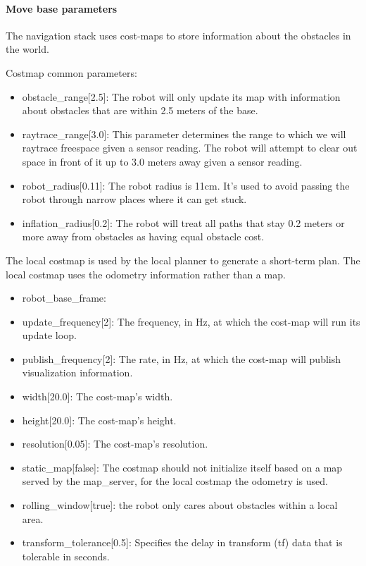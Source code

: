 \documentclass[10pt,journal,compsoc]{IEEEtran}
\begin{document}
\paragraph{Move base parameters}

The navigation stack uses cost-maps to store information about the obstacles in the world.


Costmap common parameters:

\begin{itemize}
\item obstacle\_range[2.5]: The robot will only update its map with information about obstacles that are within 2.5 meters of the base.
\item raytrace\_range[3.0]: This parameter determines the range to which we will raytrace freespace given a sensor reading. The robot will attempt to clear out space in front of it up to 3.0 meters away given a sensor reading.
\item robot\_radius[0.11]: The robot radius is 11cm. It's used to avoid passing the robot through narrow places where it can get stuck.
\item inflation\_radius[0.2]: The robot will treat all paths that stay 0.2 meters or more away from obstacles as having equal obstacle cost.
\end{itemize}

The local costmap is used by the local planner to generate a short-term plan. The local costmap uses the odometry information rather than a map.

\begin{itemize}
\item robot\_base\_frame: 
\item update\_frequency[2]: The frequency, in Hz, at which the cost-map will run its update loop. 
\item publish\_frequency[2]: The rate, in Hz, at which the cost-map will publish visualization information.
\item width[20.0]: The cost-map's width.
\item height[20.0]: The cost-map's height.
\item resolution[0.05]: The cost-map's resolution.
\item static\_map[false]: The costmap should not initialize itself based on a map served by the map\_server, for the local costmap the odometry is used.
\item rolling\_window[true]:  the robot only cares about obstacles within a local area.
\item transform\_tolerance[0.5]: Specifies the delay in transform (tf) data that is tolerable in seconds.
\end{itemize}
\end{document}

